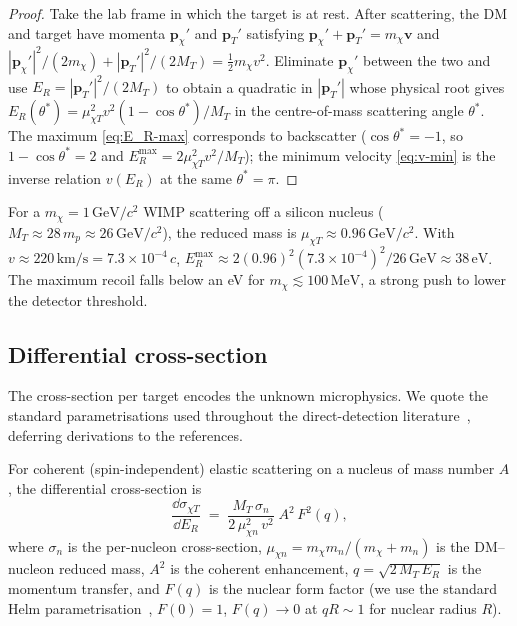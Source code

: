 \begin{proof}
Take the lab frame in which the target is at rest. After
scattering, the DM and target have momenta $\bm p_\chi'$ and
$\bm p_T'$ satisfying
$\bm p_\chi'+\bm p_T'=m_\chi\bm v$ and
$|\bm p_\chi'|^2/(2m_\chi)+|\bm p_T'|^2/(2 M_T)=\tfrac12 m_\chi v^2$.
Eliminate $\bm p_\chi'$ between the two and use
$E_R=|\bm p_T'|^2/(2M_T)$ to obtain a quadratic in
$|\bm p_T'|$ whose physical root gives
$E_R(\theta^*)=\mu_{\chi T}^2 v^2(1-\cos\theta^*)/M_T$ in the
centre-of-mass scattering angle $\theta^*$. The maximum
\cref{eq:E_R-max} corresponds to backscatter
($\cos\theta^*=-1$, so $1-\cos\theta^*=2$ and
$E_R^{\max}=2\mu_{\chi T}^2 v^2/M_T$); the minimum velocity
\cref{eq:v-min} is the inverse relation $v(E_R)$ at the same
$\theta^*=\pi$.
\end{proof}

\begin{example}
\label{ex:wimp-on-Si}
For a $m_\chi=1\,\text{GeV}/c^2$ WIMP scattering off a silicon
nucleus ($M_T\approx 28\,m_p\approx 26\,\text{GeV}/c^2$), the
reduced mass is $\mu_{\chi T}\approx 0.96\,\text{GeV}/c^2$. With
$v\approx 220\,\text{km}/\text{s}=7.3\times 10^{-4}\,c$,
$E_R^\text{max}\approx 2(0.96)^2(7.3\times 10^{-4})^2/26\,\text{GeV}
\approx 38\,\text{eV}$. The maximum recoil falls below an eV for
$m_\chi\lesssim 100\,\text{MeV}$, a strong push to lower the
detector threshold.
\end{example}

\subsection{Differential cross-section}
\label{sec:recoil-xsec}

The cross-section per target encodes the unknown microphysics. We
quote the standard parametrisations used throughout the
direct-detection literature~\cite{lewin1996}, deferring derivations
to the references.

\begin{statement}
\label{stmt:si-xsec}
For coherent (spin-independent) elastic scattering on a nucleus of
mass number $A$, the differential cross-section is
\begin{equation}
\label{eq:dsigma-dE-SI}
\frac{\dd\sigma_{\chi T}}{\dd E_R}
\;=\; \frac{M_T\,\sigma_n}{2\,\mu_{\chi n}^2\,v^2}\;A^2\,F^2(q),
\end{equation}
where $\sigma_n$ is the per-nucleon cross-section,
$\mu_{\chi n}=m_\chi m_n/(m_\chi+m_n)$ is the DM--nucleon reduced
mass, $A^2$ is the coherent enhancement, $q=\sqrt{2\,M_T\,E_R}$ is
the momentum transfer, and $F(q)$ is the nuclear form factor (we
use the standard Helm parametrisation~\cite{helm1956}, $F(0)=1$,
$F(q)\to 0$ at $qR\sim 1$ for nuclear radius $R$).
\end{statement}

